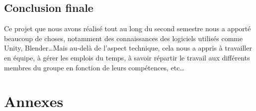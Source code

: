 \documentclass[12pt, titlepage]{article}
\begin{document}
\begin{spacing}{1.5}
\newpage

\subsection{Conclusion finale}

Ce projet que nous avons réalisé tout au long du second semestre nous a apporté beaucoup de choses, notamment des connaissances des logiciels utilisés comme Unity, Blender\dots Mais au-delà de l'aspect technique, cela nous a appris à travailler en équipe, à gérer les emplois du temps, à savoir répartir le travail aux différents membres du groupe en fonction de leurs compétences, etc\dots

\newpage
\section{Annexes}

\end{spacing}
\end{document}

